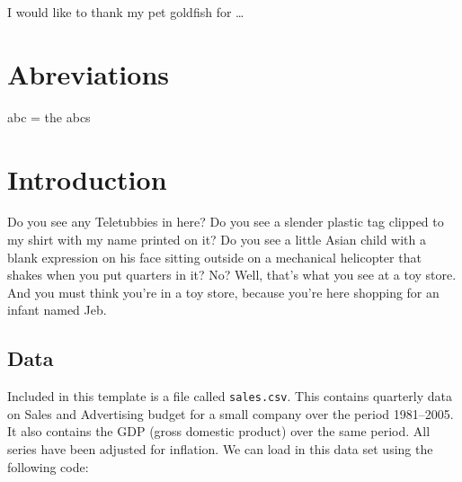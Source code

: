 \documentclass[12pt]{report}
\begin{document}

I would like to thank my pet goldfish for \ldots{}

\setcounter{page}{4}

\tableofcontents
\newpage

{}
\listoftables
\newpage

{}
\listoffigures
\newpage


\hypertarget{abreviations}{%
\chapter*{Abreviations}\label{abreviations}}


abc = the abcs

\cleardoublepage
{}
\markright{\thepage}
\newpage
{}


\hypertarget{introduction}{%
\chapter{Introduction}\label{introduction}}

Do you see any Teletubbies in here? Do you see a slender plastic tag
clipped to my shirt with my name printed on it? Do you see a little
Asian child with a blank expression on his face sitting outside on a
mechanical helicopter that shakes when you put quarters in it? No? Well,
that's what you see at a toy store. And you must think you're in a toy
store, because you're here shopping for an infant named Jeb.

\hypertarget{data}{%
\section{Data}\label{data}}

Included in this template is a file called \texttt{sales.csv}. This
contains quarterly data on Sales and Advertising budget for a small
company over the period 1981--2005. It also contains the GDP (gross
domestic product) over the same period. All series have been adjusted
for inflation. We can load in this data set using the following code:
\end{document}
